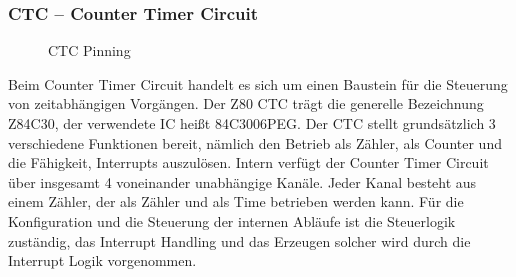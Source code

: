 \subsubsection{CTC -- Counter Timer Circuit}
\begin{figure}[H]
    \qquad
    \qquad
    \caption[Z80 CTC Pinning]{CTC Pinning \cite{z80:ctc}}
    \label{fig:z80-ctc-pinning}
\end{figure}

Beim Counter Timer Circuit handelt es sich um einen Baustein für die Steuerung von zeitabhängigen Vorgängen. Der Z80 CTC trägt die generelle Bezeichnung Z84C30, der verwendete IC heißt 84C3006PEG. Der CTC stellt grundsätzlich 3 verschiedene Funktionen bereit, nämlich den Betrieb als Zähler, als Counter und die Fähigkeit, Interrupts auszulösen. Intern verfügt der Counter Timer Circuit über insgesamt 4 voneinander unabhängige Kanäle. Jeder Kanal besteht aus einem Zähler, der als Zähler und als Time betrieben werden kann. Für die Konfiguration und die Steuerung der internen Abläufe ist die Steuerlogik zuständig, das Interrupt Handling und das Erzeugen solcher wird durch die Interrupt Logik vorgenommen.

